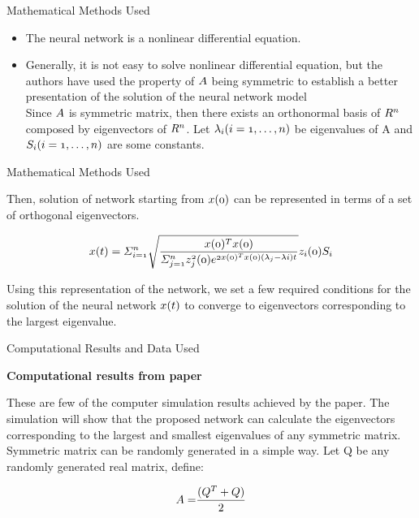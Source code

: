 \documentclass[13.5pt, aspectratio=169]{beamer}
\newcommand\myheading[1]{%
  \par\bigskip
  {\Large\bfseries#1}\par\smallskip}
\begin{document}
\begin{frame}{Mathematical Methods Used}

    \begin{itemize}
        \item<1->[]The neural network is a nonlinear differential equation.
        \item<2->[]Generally, it is not easy to solve nonlinear differential equation, but the authors have used the property of $\mathnormal{A}$ being symmetric to establish a better presentation of the solution of the neural network model \\ Since $\mathnormal{A}$ is symmetric matrix, then there exists an orthonormal basis of $\mathnormal{R^n}$ composed by eigenvectors of $\mathnormal{R^n}$. Let $\mathnormal{\lambda_i (i = 1, \ldots, n)}$ be eigenvalues of A and $\mathnormal{S_i (i = 1, \ldots, n)}$ are some constants.
    \end{itemize}

\end{frame}

\begin{frame}{Mathematical Methods Used}

    Then, solution of network starting from $\mathnormal{x(0)}$ can be represented in terms of a set of orthogonal eigenvectors.

    \Large
    \[
        \mathnormal{
            x(t) = \Sigma_{i=1}^{n} \sqrt{
                \frac{x(0)^{T}x(0)}{
                    \Sigma_{j=1}^{n} z_{j}^{2}(0)e^{2x(0)^{T}x(0)(\lambda_{j} - \lambda{i})t}
                }
            }z_{i}(0)S_{i}
        }
    \]

    \normalsize
    Using this representation of the network, we set a few required conditions for the solution of the neural network $\mathnormal{x(t)}$ to converge to eigenvectors corresponding to the largest eigenvalue.
    

\end{frame}

\begin{frame}{Computational Results and Data Used}
    \myheading{Computational results from paper}
    These are few of the computer simulation results achieved by the paper. The simulation will show that the proposed network can calculate the eigenvectors corresponding
    to the largest and smallest eigenvalues of any symmetric matrix. Symmetric matrix can be randomly generated in a simple way. Let Q be any randomly generated real matrix, define:

    \[ \mathnormal{A = } \frac{\mathnormal{(Q^T + Q)}}{2}\]

\end{frame}
\end{document}
